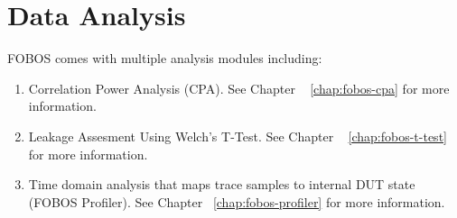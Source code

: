 \section{Data Analysis}
FOBOS comes with multiple analysis modules including:
\begin{enumerate}
 \item Correlation Power Analysis (CPA). See  Chapter ~ \ref{chap:fobos-cpa} for more information.
 \item Leakage Assesment Using Welch's T-Test. See Chapter ~ \ref{chap:fobos-t-test} for more information.
 \item Time domain analysis that maps trace samples to internal DUT state (FOBOS Profiler). See Chapter~ \ref{chap:fobos-profiler} for more information.
\end{enumerate}



